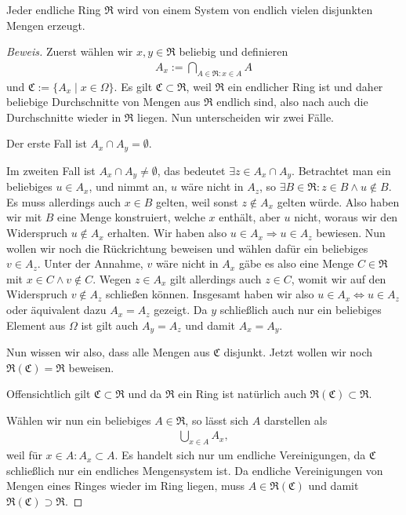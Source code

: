 \begin{lemma}
    Jeder endliche Ring $\mathfrak{R}$ wird von einem System von endlich vielen disjunkten Mengen erzeugt.
\end{lemma}
\begin{proof}[Beweis]
    Zuerst wählen wir $x,y\in\mathfrak{R}$ beliebig und definieren
    \begin{align*}
        A_x:=\bigcap_{A\in\mathfrak{R}:x\in A}A
    \end{align*}
    und $\mathfrak{C}:=\{A_x\mid x\in\Omega\}$. Es gilt $\mathfrak{C}\subset\mathfrak{R}$, weil $\mathfrak{R}$ ein endlicher Ring ist und daher beliebige Durchschnitte von Mengen aus $\mathfrak{R}$ endlich sind, also nach \cite[Satz 2.1]{GrillSkript} auch die Durchschnitte wieder in $\mathfrak{R}$ liegen. Nun unterscheiden wir zwei Fälle.

    Der erste Fall ist $A_x\cap A_y=\emptyset$.

    Im zweiten Fall ist $A_x\cap A_y\neq\emptyset$, das bedeutet $\exists z\in A_x\cap A_y$. Betrachtet man ein beliebiges $u\in A_x$, und nimmt an, $u$ wäre nicht in $A_z$, so $\exists B\in \mathfrak{R}:z\in B \land u\notin B$. Es muss allerdings auch $x\in B$ gelten, weil sonst $z\notin A_x$ gelten würde. Also haben wir mit $B$ eine Menge konstruiert, welche $x$ enthält, aber $u$ nicht, woraus wir den Widerspruch $u\notin A_x$ erhalten. Wir haben also $u\in A_x\Rightarrow u\in A_z$ bewiesen. Nun wollen wir noch die Rückrichtung beweisen und wählen dafür ein beliebiges $v\in A_z$. Unter der Annahme, $v$ wäre nicht in $A_x$ gäbe es also eine Menge $C\in \mathfrak{R}$ mit $x\in C\land v\notin C$. Wegen $z\in A_x$ gilt allerdings auch $z\in C$, womit wir auf den Widerspruch $v\notin A_z$ schließen können. Insgesamt haben wir also $u\in A_x\Leftrightarrow u\in A_z$ oder äquivalent dazu $A_x=A_z$ gezeigt. Da $y$ schließlich auch nur ein beliebiges Element aus $\Omega$ ist gilt auch $A_y=A_z$ und damit $A_x=A_y$. 

    Nun wissen wir also, dass alle Mengen aus $\mathfrak{C}$ disjunkt. Jetzt wollen wir noch $\mathfrak{R}(\mathfrak{C})=\mathfrak{R}$ beweisen.

    Offensichtlich gilt $\mathfrak{C}\subset \mathfrak{R}$ und da $\mathfrak{R}$ ein Ring ist natürlich auch $\mathfrak{R}(\mathfrak{C})\subset\mathfrak{R}$. 

    Wählen wir nun ein beliebiges $A\in \mathfrak{R}$, so lässt sich $A$ darstellen als 
    \begin{align*}
        \bigcup_{x\in A}A_x,
    \end{align*}
    weil für $x\in A:A_x\subset A$. Es handelt sich nur um endliche Vereinigungen, da $\mathfrak{C}$ schließlich nur ein endliches Mengensystem ist. Da endliche Vereinigungen von Mengen eines Ringes wieder im Ring liegen, muss $A\in\mathfrak{R}(\mathfrak{C})$ und damit $\mathfrak{R}(\mathfrak{C})\supset\mathfrak{R}$.

\end{proof}

